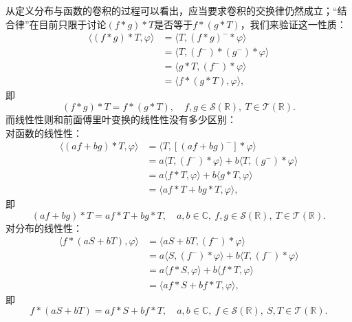 从定义分布与函数的卷积的过程可以看出，应当要求卷积的交换律仍然成立；“结合律”在目前只限于讨论$(f*g)*T$是否等于$f*(g*T)$，我们来验证这一性质：
\begin{align}
    \langle (f*g)*T,\varphi\rangle & =\langle T,(f*g)^- *\varphi\rangle\nonumber\\
    & =\langle T,(f^-)*(g^-)*\varphi\rangle\nonumber\\
    & =\langle g*T,(f^-)*\varphi\rangle\nonumber\\
    & =\langle f*(g*T),\varphi\rangle,
\end{align}
即
\begin{equation}
    (f*g)*T=f*(g*T),\quad f,g\in\mathcal{S}(\mathbb{R}),\ T\in\mathcal{T}(\mathbb{R}).
\end{equation}
而线性性则和前面傅里叶变换的线性性没有多少区别：\\
 对函数的线性性：
\begin{align}
    \langle (af+bg)*T,\varphi\rangle & =\langle T,[(af+bg)^-]*\varphi\rangle\nonumber                                               \\
                                     & =a\langle T,(f^-)*\varphi\rangle+b\langle T,(g^-)*\varphi\rangle\nonumber                    \\
                                     & =a\langle f*T,\varphi\rangle+b\langle g*T,\varphi\rangle\nonumber                            \\
                                     & =\langle af*T+bg*T,\varphi\rangle,
\end{align}
即
\begin{equation}
    (af+bg)*T=af*T+bg*T,\quad a,b\in\mathbb{C},\ f,g\in\mathcal{S}(\mathbb{R}),\ T\in\mathcal{T}(\mathbb{R}).
\end{equation}
{\parskip=0pt  对分布的线性性：}
\begin{align}
    \langle f*(aS+bT),\varphi\rangle & =\langle aS+bT,(f^-)*\varphi\rangle\nonumber                                                 \\
                                     & =a\langle S,(f^-)*\varphi\rangle+b\langle T,(f^-)*\varphi\rangle\nonumber                    \\
                                     & =a\langle f*S,\varphi\rangle+b\langle f*T,\varphi\rangle\nonumber                            \\
                                     & =\langle af*S+bf*T,\varphi\rangle,
\end{align}
即
\begin{equation}
    f*(aS+bT)=af*S+bf*T,\quad a,b\in\mathbb{C},\ f\in\mathcal{S}(\mathbb{R}),\ S,T\in\mathcal{T}(\mathbb{R}).
\end{equation}


